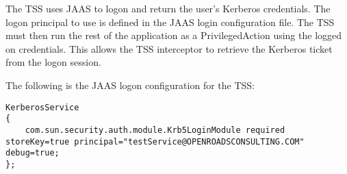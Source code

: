 The TSS uses JAAS to logon and return the user's Kerberos credentials. The
logon principal to use is defined in the JAAS login configuration file.
The TSS must then run the rest of the application as a PrivilegedAction using
the logged on credentials. This allows the TSS interceptor to retrieve the
Kerberos ticket from the logon session.

The following is the JAAS logon configuration for the TSS:

\begin{scriptsize}
\begin{verbatim}
KerberosService
{
    com.sun.security.auth.module.Krb5LoginModule required storeKey=true principal="testService@OPENROADSCONSULTING.COM" debug=true;
};
\end{verbatim}
\end{scriptsize}

